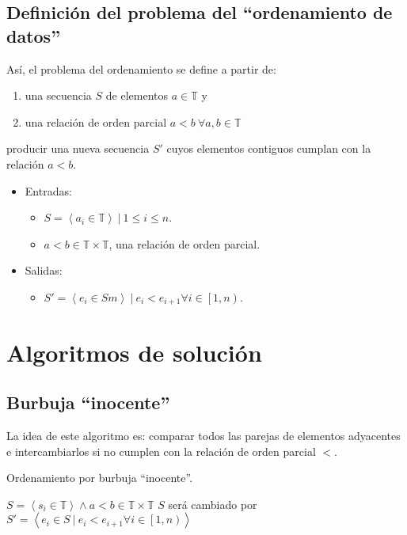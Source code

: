 \documentclass[]{article}
\begin{document}
\subsection{Definición del problema del ``ordenamiento de datos''} \label{problema}
Así, el problema del ordenamiento se define a partir de:
\begin{enumerate}
    \item una secuencia $S$ de elementos $a\in \mathbb{T}$ y
    \item una relación de orden parcial $a<b~\forall a,b\in \mathbb{T}$
\end{enumerate}
producir una nueva secuencia $S'$ cuyos elementos contiguos cumplan con la relación $a<b$.
\begin{itemize}
    \item Entradas:
          \begin{itemize}
              \item $S = \left< a_i \in \mathbb{T} \right> ~ | ~ 1\le i \le n$.
              \item $a<b \in \mathbb{T} \times \mathbb{T}$, una relación de orden parcial.
          \end{itemize}
    \item Salidas:
          \begin{itemize}
              \item $S' = \left< e_i \in S m\right> ~ | ~ e_i < e_{i+1} \forall i \in \left[1,n\right)$.
          \end{itemize}
\end{itemize}

\section{Algoritmos de solución} \label{algoritmos}
\subsection{Burbuja ``inocente''} \label{algoritmos:inocente}
La idea de este algoritmo es: comparar todos las parejas de elementos adyacentes e intercambiarlos si no cumplen con la relación de orden parcial $<$.

\begin{algorithm}[!htb]
    \caption{Ordenamiento por burbuja ``inocente''.}
    \begin{algorithmic}[1]
        \Require $S=\left< s_i \in \mathbb{T} \right> \land a<b \in \mathbb{T} \times \mathbb{T}$
        \Ensure $S$ será cambiado por $S' = \left< e_i \in S  ~ | ~ e_i < e_{i+1} \forall i \in \left[1,n\right)\right>$
        \State {}
        \EndIf
        \EndFor
        \EndFor
        \EndProcedure
    \end{algorithmic}
\end{algorithm}
\end{document}
